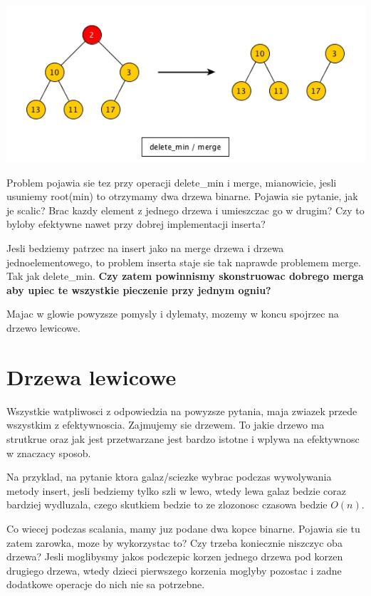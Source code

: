 \documentclass{article}
\begin{document}
\begin{center}
    \begin{minipage}[h]{0.8\textwidth}
        \centering
        \includegraphics[width=1.0\textwidth]{delete_min.png}
    \end{minipage}    
\end{center}

Problem pojawia sie tez przy operacji delete\_min i merge, mianowicie, jesli usuniemy root(min) to otrzymamy dwa drzewa binarne. Pojawia sie pytanie, jak je scalic? Brac kazdy element z jednego drzewa i umieszczac go w drugim? Czy to byloby efektywne nawet przy dobrej implementacji inserta?

Jesli bedziemy patrzec na insert jako na merge drzewa i drzewa jednoelementowego, to problem inserta staje sie tak naprawde problemem merge. Tak jak delete\_min. \textbf{Czy zatem powinnismy skonstruowac dobrego merga aby upiec te wszystkie pieczenie przy jednym ogniu?}

Majac w glowie powyzsze pomysly i dylematy, mozemy w koncu spojrzec na drzewo lewicowe.

\section{Drzewa lewicowe}

Wszystkie watpliwosci z odpowiedzia na powyzsze pytania, maja zwiazek przede wszystkim z efektywnoscia. Zajmujemy sie drzewem. To jakie drzewo ma strutkrue oraz jak jest przetwarzane jest bardzo istotne i wplywa na efektywnosc w znaczacy sposob.

Na przyklad, na pytanie ktora galaz/sciezke wybrac podczas wywolywania metody insert, jesli bedziemy tylko szli w lewo, wtedy lewa galaz bedzie coraz bardziej wydluzala, czego skutkiem bedzie to ze zlozonosc czasowa bedzie $O(n)$.

Co wiecej podczas scalania, mamy juz podane dwa kopce binarne. Pojawia sie tu zatem zarowka, moze by wykorzystac to? Czy trzeba koniecznie niszczyc oba drzewa? Jesli moglibysmy jakos podczepic korzen jednego drzewa pod korzen drugiego drzewa, wtedy dzieci pierwszego korzenia moglyby pozostac i zadne dodatkowe operacje do nich nie sa potrzebne.
\end{document}
